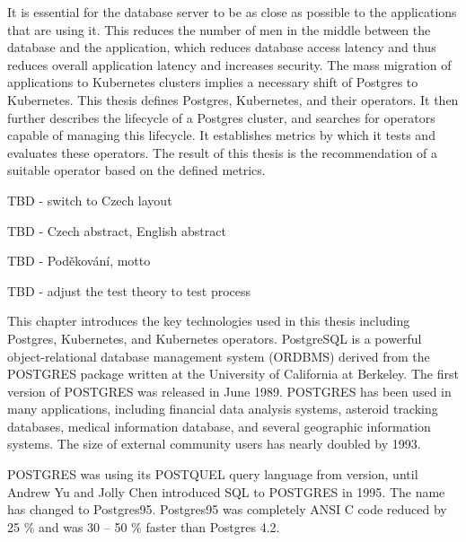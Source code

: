
It is essential for the database server to be as close as possible to the applications that are using it. This reduces the number of men in the middle between the database and the application, which reduces database access latency and thus reduces overall application latency and increases security. The mass migration of applications to Kubernetes clusters implies a necessary shift of Postgres to Kubernetes. This thesis defines Postgres, Kubernetes, and their operators. It then further describes the lifecycle of a Postgres cluster, and searches for operators capable of managing this lifecycle. It establishes metrics by which it tests and evaluates these operators.  The result of this thesis is the recommendation of a suitable operator based on the defined metrics.

TBD - switch to Czech layout

TBD - Czech abstract, English abstract

TBD - Poděkování, motto

TBD - adjust the test theory to test process


\sloppy
{}
This chapter introduces the key technologies used in this thesis including Postgres, Kubernetes, and Kubernetes operators.
PostgreSQL is a powerful object-relational database management system (ORDBMS) derived from the POSTGRES package written at the University of California at Berkeley. \cite{docuPgwhatIsPg} \cite{pg14introduction} The first version of POSTGRES was released in June 1989. POSTGRES has been used in many applications, including financial data analysis systems, asteroid tracking databases, medical information database, and several geographic information systems. The size of external community users has nearly doubled by 1993. \cite{docuPgBriefHistory}

POSTGRES was using its POSTQUEL query language from version, until Andrew Yu and Jolly Chen introduced SQL to POSTGRES in 1995. The name has changed to Postgres95. Postgres95 was completely ANSI C code reduced by 25 \% and was 30 – 50 \% faster than Postgres 4.2.  \cite{docuPgBriefHistory}

